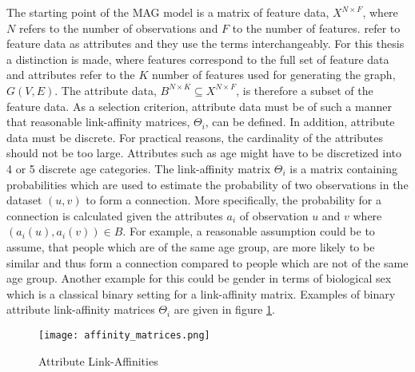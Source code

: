 	\noindent The starting point of the MAG model is a matrix of feature data, 
	$X^{N \times F}$, where $N$ refers to the number of observations 
	and $F$ to the number of features. \citeauthor{kim2012multiplicative} refer 
	to feature data as attributes and they use the terms interchangeably. For this 
	thesis a distinction is made, where features correspond to the full set of 
	feature data and attributes refer to the $K$ number of features used for 
	generating the graph, $G(V,E)$. The attribute data, 
	$B^{N \times K} \subseteq X^{N \times F}$, is therefore a subset of the 
	feature data. As a selection criterion, attribute data must be of such a 
	manner that reasonable link-affinity matrices, $\Theta_{i}$, can be 
	defined. In addition, attribute data must be discrete. For practical
	reasons, the cardinality of the attributes should not be too large.
	Attributes such as age might have to be discretized into 4 or 5 discrete
	age categories. The link-affinity matrix $\Theta_{i}$ is a matrix
	containing probabilities which are used to estimate the probability of two 
	observations in the dataset $(u,v)$ to form a connection. More specifically, 
	the probability for a connection is calculated given the attributes $a_i$ of 
	observation $u$ and $v$ where $(a_{i}(u),a_{i}(v))\in B$. For example, a 
	reasonable assumption could be to assume, that people which are of the same 
	age group, are more likely to be similar and thus form a connection 
	compared to people which are not of the same age group. Another example for 
	this could be gender in terms of biological sex which is a classical binary 
	setting for a link-affinity matrix. Examples of binary attribute 
	link-affinity matrices $\Theta_i$ are given in 
	figure \ref{fig:link-affinity}.

	\begin{figure}[h]
		\centering
		\texttt{[image: affinity\_matrices.png]}
		\caption{Attribute Link-Affinities}
		\cite[p. 118]{kim2012multiplicative}
		\label{fig:link-affinity}
	\end{figure}

